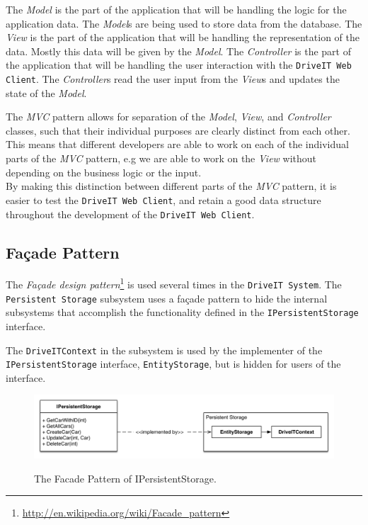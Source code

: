 The \textit{Model} is the part of the application that will be handling the logic for the application data. The \textit{Model}s are being used to store data from the database.
The \textit{View} is the part of the application that will be handling the representation of the data. Mostly this data will be given by the \textit{Model}.
The \textit{Controller} is the part of the application that will be handling the user interaction with the \texttt{DriveIT Web Client}. The \textit{Controller}s read the user input from the \textit{View}s and updates the state of the \textit{Model}.

The \textit{MVC} pattern allows for separation of the \textit{Model}, \textit{View}, and \textit{Controller} classes, such that their individual purposes are clearly distinct from each other. This means that different developers are able to work on each of the individual parts of the \textit{MVC} pattern, e.g we are able to work on the \textit{View} without depending on the business logic or the input.\\

By making this distinction between different parts of the \textit{MVC} pattern, it is easier to test the \texttt{DriveIT Web Client}, and retain a good data structure throughout the development of the \texttt{DriveIT Web Client}.

\subsection{Façade Pattern}
The \textit{Façade design pattern}\footnote{\url{http://en.wikipedia.org/wiki/Facade_pattern}} is used several times in the \texttt{DriveIT System}.
The \texttt{Persistent Storage} subsystem uses a façade pattern to hide the internal subsystems that accomplish the functionality defined in the \texttt{IPersistentStorage} interface.

The \texttt{DriveITContext} in the subsystem is used by the implementer of the \texttt{IPersistentStorage} interface, \texttt{EntityStorage}, but is hidden for users of the interface.

\begin{figure}[H]
	\centering
	\includegraphics[width=\textwidth]{Figures/FacadePatternPersistentStorage}\\
	\caption{The Facade Pattern of IPersistentStorage.}
	\label{fig:The Facade Pattern of IPersistentStorage.}
\end{figure}

